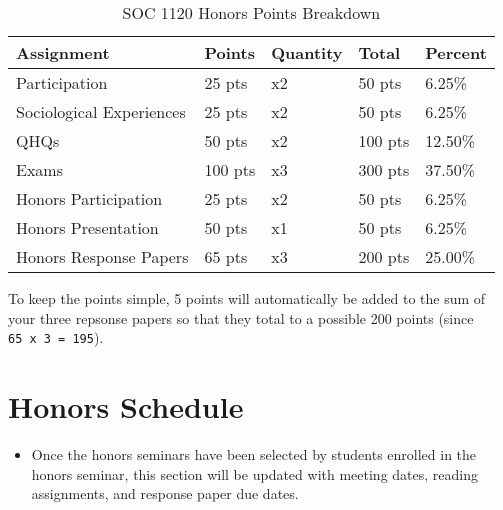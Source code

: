 \documentclass[]{book}
\newenvironment{rmdblock}[1]
  {\begin{shaded*}
  \begin{itemize}
  \renewcommand{\labelitemi}{
    \raisebox{-.7\height}[0pt][0pt]{
      {\setkeys{Gin}{width=3em,keepaspectratio}\texttt{[image: images/\#1]}}
    }
  }
  \item
  }
  {
  \end{itemize}
  \end{shaded*}
  }
\newenvironment{rmdwarning}
  {\begin{rmdblock}{warning}}
  {\end{rmdblock}}
\theoremstyle{definition}
\theoremstyle{definition}
\theoremstyle{definition}
\theoremstyle{remark}
\begin{document}
\begin{table}

\caption{\label{tab:unnamed-chunk-5}SOC 1120 Honors Points Breakdown}
\centering
\begin{tabular}[t]{lllll}
\toprule
Assignment & Points & Quantity & Total & Percent\\
\midrule
Participation & 25 pts & x2 & 50 pts & 6.25\%\\
Sociological Experiences & 25 pts & x2 & 50 pts & 6.25\%\\
QHQs & 50 pts & x2 & 100 pts & 12.50\%\\
Exams & 100 pts & x3 & 300 pts & 37.50\%\\
Honors Participation & 25 pts & x2 & 50 pts & 6.25\%\\
\addlinespace
Honors Presentation & 50 pts & x1 & 50 pts & 6.25\%\\
Honors Response Papers & 65 pts & x3 & 200 pts & 25.00\%\\
\bottomrule
\end{tabular}
\end{table}

To keep the points simple, 5 points will automatically be added to the
sum of your three repsonse papers so that they total to a possible 200
points (since \texttt{65\ x\ 3\ =\ 195}).

\hypertarget{honors-schedule}{%
\chapter{Honors Schedule}\label{honors-schedule}}

\begin{rmdwarning}
Once the honors seminars have been selected by students enrolled in the
honors seminar, this section will be updated with meeting dates, reading
assignments, and response paper due dates.
\end{rmdwarning}


\end{document}
